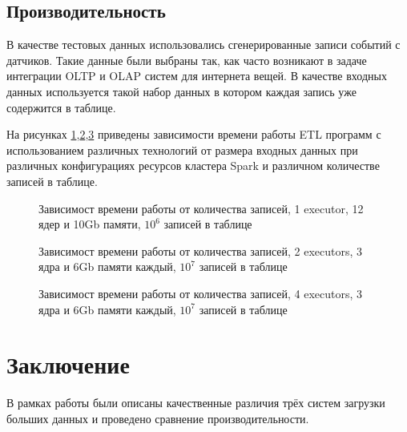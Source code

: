 \documentclass[%
bachelor,    %
subf,        %
href,        %
colorlinks,  %
]{disser}
\begin{document}

\subsection{Производительность}
В качестве тестовых данных использовались сгенерированные записи событий с датчиков. Такие данные были выбраны так, как часто возникают в задаче интеграции OLTP и OLAP систем для интернета вещей.\cite{test_data} В качестве входных данных используется такой набор данных в котором каждая запись уже содержится в таблице.

На рисунках \ref{fig:1},\ref{fig:2},\ref{fig:3} приведены зависимости времени работы ETL программ с использованием различных технологий от размера входных данных при различных конфигурациях ресурсов кластера Spark и различном количестве записей в таблице.

\begin{figure}
	
	\caption{Зависимост времени работы от количества записей, 1 executor, 12 ядер и 10Gb памяти, $10^6$ записей в таблице}
	\label{fig:1}
\end{figure}
\begin{figure}
	
	\caption{Зависимост времени работы от количества записей, 2 executors, 3 ядра и 6Gb памяти каждый, $10^7$ записей в таблице}
	\label{fig:2}
\end{figure}
\begin{figure}
	
	\caption{Зависимост времени работы от количества записей, 4 executors, 3 ядра и 6Gb памяти каждый, $10^7$ записей в таблице}
	\label{fig:3}
\end{figure}

\section{Заключение}
В рамках работы были описаны качественные различия трёх систем загрузки больших данных и проведено сравнение производительности.
\printbibliography[heading=bibintoc]

\appendix
\end{document}
